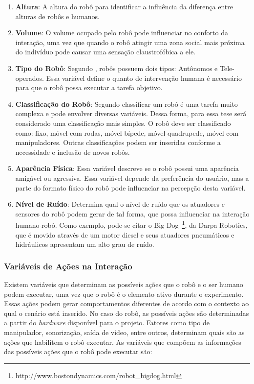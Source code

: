 \begin{enumerate}
    \item \textbf{Altura}: A altura do robô para identificar a influência da diferença entre alturas de robôs e humanos.
    \item \textbf{Volume}: O volume ocupado pelo robô pode influenciar no conforto da interação, uma vez que quando o robô atingir uma zona social mais próxima do indivíduo pode causar uma sensação claustrofóbica a ele.
    \item \textbf{Tipo do Robô}: Segundo \textcite{choi:2014}, robôs possuem dois tipos: Autônomos e Tele-operados. Essa variável define o quanto de intervenção humana é necessário para que o robô possa executar a tarefa objetivo.
    \item \textbf{Classificação do Robô}: Segundo \textcite{dobra:2014} classificar um robô é uma tarefa muito complexa e pode envolver diversas variáveis. Dessa forma, para essa tese será considerado uma classificação mais simples. O robô deve ser classificado como: fixo, móvel com rodas, móvel bípede, móvel quadrupede, móvel com manipuladores. Outras classificações podem ser inseridas conforme a necessidade e inclusão de novos robôs.
    \item \textbf{Aparência Física}: Essa variável descreve se o robô possui uma aparência amigável ou agressiva. Essa variável depende da preferência do usuário, mas a parte do formato físico do robô pode influenciar na percepção desta variável.
    \item \textbf{Nível de Ruído}: Determina qual o nível de ruído que os atuadores e sensores do robô podem gerar de tal forma, que possa influenciar na interação humano-robô. Como exemplo, pode-se citar o Big Dog~\footnote{http://www.bostondynamics.com/robot\_bigdog.html}, da Darpa Robotics, que é movido através de um motor diesel e seus atuadores pneumáticos e hidráulicos apresentam um alto grau de ruído.
\end{enumerate}

\subsubsection{Variáveis de Ações na Interação}
\label{sec:acoes}
Existem variáveis que determinam as possíveis ações que o robô e o ser humano podem executar, uma vez que o robô é o elemento ativo durante o experimento. Essas ações podem gerar comportamentos diferentes de acordo com o contexto ao qual o cenário está inserido. No caso do robô, as possíveis ações são determinadas a partir do \emph{hardware} disponível para o projeto. Fatores como tipo de manipulador, sonorização, saída de vídeo, entre outros, determinam quais são as ações que habilitem o robô executar. As variáveis que compõem as informações das possíveis ações que o robô pode executar são:

